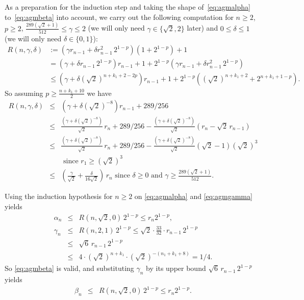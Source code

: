 \documentclass [11pt]{article}
\renewcommand {\leq}{\leqslant}
\renewcommand {\geq}{\geqslant}
\begin{document}
As a preparation for the induction step and taking the shape
of~\eqref {eq:agmalpha} to~\eqref {eq:agmbeta} into account, we carry out
the following computation for $n \geq 2$, $p \geq 2$,
$\frac {289 (\sqrt 2 + 1)}{512} \leq \gamma \leq 2$
(we will only need $\gamma \in \{ \sqrt 2, 2 \}$ later) and
$0 \leq \delta \leq 1$ (we will only need $\delta \in \{ 0, 1 \}$):
\[
\begin {aligned}
R (n, \gamma, \delta) &:=
  \left( \gamma r_{n-1} + \delta r_{n-1}^2 \, 2^{1-p} \right)
   \left( 1 + 2^{1-p} \right) + 1 \\
& = \left( \gamma + \delta r_{n-1} \, 2^{1-p} \right) r_{n-1} + 1
   + 2^{1-p} \left( \gamma r_{n-1} + \delta r_{n-1}^2 \, 2^{1-p} \right) \\
& \leq \left( \gamma + \delta (\sqrt 2)^{n + k_1 + 2 - 2 p} \right) r_{n-1}
   + 1 +
   2^{1-p} \left( (\sqrt 2)^{n + k_1 + 2} + 2^{n + k_1 + 1 - p} \right).
\end {aligned}
\]
So assuming $p \geq \frac {n + k_1 + 10}{2}$ we have
\begin {eqnarray*}
R (n, \gamma, \delta)
& \leq & \left( \gamma + \delta (\sqrt 2)^{-8} \right) r_{n-1}
   + 289/256 \\
& \leq & \frac {\left( \gamma + \delta (\sqrt 2)^{-8} \right)}{\sqrt 2}
   \, r_n + 289/256
   - \frac {\left( \gamma + \delta (\sqrt 2)^{-8} \right)}{\sqrt 2}
   \left( r_n - \sqrt 2 \, r_{n-1} \right) \\
& \leq & \frac {\left( \gamma + \delta (\sqrt 2)^{-8} \right)}{\sqrt 2}
   \, r_n + 289/256
   - \frac {\left( \gamma + \delta (\sqrt 2)^{-8} \right)}{\sqrt 2}
   \left( \sqrt 2 - 1 \right) (\sqrt 2)^3 \\
&&   \text { since } r_1 \geq (\sqrt 2)^3 \\
& \leq & \left( \frac {\gamma}{\sqrt 2} + \frac {\delta}{16 \sqrt 2} \right)
   \, r_n
   \text { since } \delta \geq 0
   \text { and } \gamma \geq \frac {289 (\sqrt 2 + 1)}{512}.
\end {eqnarray*}

\noindent
Using the induction hypothesis for $n \geq 2$ on \eqref {eq:agmalpha}
and \eqref {eq:agmgamma}
yields
\begin {eqnarray*}
\alpha_n
& \leq & R (n, \sqrt 2, 0) \, 2^{1-p} \leq r_n 2^{1-p}, \\
\gamma_n
& \leq & R (n, 2, 1) \, 2^{1-p}
\leq \sqrt 2 \cdot \frac {33}{32} \cdot r_{n-1} \, 2^{1-p} \\
& \leq &
\sqrt 6 \, r_{n-1} \, 2^{1-p} \\
& \leq &
4 \cdot (\sqrt 2)^{n + k_1} \cdot (\sqrt 2)^{- (n_1 + k_1 + 8)}
= 1/4.
\end {eqnarray*}
So \eqref {eq:agmbeta} is valid, and substituting $\gamma_n$ by its
upper bound $\sqrt 6 \, r_{n-1} \, 2^{1-p}$ yields
\begin {eqnarray*}
\beta_n
& \leq & R (n, \sqrt 2, 0) \, 2^{1-p}
\leq r_n 2^{1-p}.
\end {eqnarray*}
\end{document}

